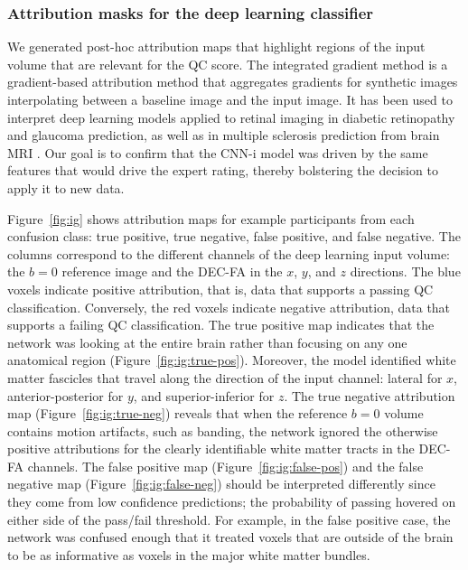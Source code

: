 \documentclass[fleqn,10pt,inline]{wlscirep}
\begin{document}
\subsubsection*{Attribution masks for the deep learning classifier}

We generated post-hoc attribution maps that highlight regions of the input
volume that are relevant for the QC score. The integrated gradient method
\cite{sundararajan2017axiomatic} is a gradient-based attribution method
\cite{ancona2019gradient} that aggregates gradients for synthetic images
interpolating between a baseline image and the input image. It has been used to
interpret deep learning models applied to retinal imaging in diabetic
retinopathy \cite{sayres2019using} and glaucoma \cite{Mehta2021-zp} prediction,
as well as in multiple sclerosis prediction from brain MRI
\cite{wargnier-dauchelle2021interpretable}. Our goal is to confirm that the
CNN-i model
was driven by the same features that would drive the expert rating,
thereby bolstering the decision to apply it to new data.

Figure~\ref{fig:ig} shows attribution maps for example participants from each
confusion class: true positive, true negative, false positive, and false
negative. The columns correspond to the different channels of the deep learning
input volume: the $b=0$ reference image and the DEC-FA in the $x$, $y$, and $z$
directions. The blue voxels indicate positive attribution, that is, data that supports a passing QC classification. Conversely, the red voxels indicate negative attribution, data that supports a failing QC classification.
The true positive map indicates that the network was looking at the
entire brain rather than focusing on any one anatomical region
(Figure~\ref{fig:ig:true-pos}). Moreover, the model identified white matter
fascicles that travel along the direction of the input channel: lateral for $x$,
anterior-posterior for $y$, and superior-inferior for $z$. The true negative
attribution map (Figure~\ref{fig:ig:true-neg}) reveals that when the reference
$b=0$ volume contains motion artifacts, such as banding, the network ignored the
otherwise positive attributions for the clearly identifiable white matter tracts
in the DEC-FA channels. The false positive map (Figure~\ref{fig:ig:false-pos})
and the false negative map (Figure~\ref{fig:ig:false-neg}) should be interpreted
differently since they come from low confidence predictions; the probability of
passing hovered on either side of the pass/fail threshold. For example, in the
false positive case, the network was confused enough that it treated voxels that
are outside of the brain to be as informative as voxels in the major white matter bundles.
\end{document}
